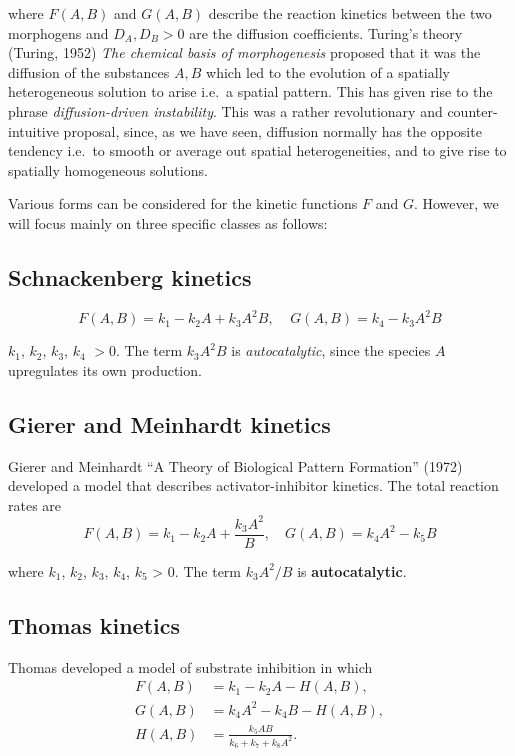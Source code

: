 \documentclass[
  letterpaper,
  DIV=11,
  numbers=noendperiod]{scrreprt}
\theoremstyle{plain}
\theoremstyle{definition}
\theoremstyle{plain}
\theoremstyle{remark}
\begin{document}
where \(F(A,B)\) and \(G(A,B)\) describe the reaction kinetics between
the two morphogens and \(D_A, D_B > 0\) are the diffusion coefficients.
Turing's theory (Turing, 1952) \emph{The chemical basis of
morphogenesis} proposed that it was the diffusion of the substances
\(A,B\) which led to the evolution of a spatially heterogeneous solution
to arise i.e.~a spatial pattern. This has given rise to the phrase
\emph{diffusion-driven instability}. This was a rather revolutionary and
counter-intuitive proposal, since, as we have seen, diffusion normally
has the opposite tendency i.e.~to smooth or average out spatial
heterogeneities, and to give rise to spatially homogeneous solutions.

Various forms can be considered for the kinetic functions \(F\) and
\(G\). However, we will focus mainly on three specific classes as
follows:

\hypertarget{schnackenberg-kinetics}{%
\subsection{Schnackenberg kinetics}\label{schnackenberg-kinetics}}

\[
F(A,B) = k_1 - k_2 A + k_3 A^2 B, \;\;\;\; G(A,B) = k_4 - k_3 A^2 B
\]

\(k_1\), \(k_2\), \(k_3\), \(k_4\) \(>0\). The term \(k_3 A^2 B\) is
\emph{autocatalytic}, since the species \(A\) upregulates its own
production.

\hypertarget{gierer-and-meinhardt-kinetics}{%
\subsection{Gierer and Meinhardt
kinetics}\label{gierer-and-meinhardt-kinetics}}

Gierer and Meinhardt {``A Theory of Biological Pattern Formation''}
(1972) developed a model that describes activator-inhibitor kinetics.
The total reaction rates are \[
F(A,B) = k_1 - k_2 A + \frac{k_3 A^2}{B}, \quad G(A,B) = k_4 A^2 - k_5 B
\]

where \(k_1\), \(k_2\), \(k_3\), \(k_4\), \(k_5\) \textgreater{} 0. The
term \(k_3 A^2 / B\) is \textbf{autocatalytic}.

\hypertarget{thomas-kinetics}{%
\subsection{Thomas kinetics}\label{thomas-kinetics}}

Thomas developed a model of substrate inhibition in which \[
\begin{aligned}
F(A,B) &= k_1 - k_2 A - H(A,B), \\
G(A,B) &= k_4 A^2 - k_4 B -H(A,B), \\ 
H(A,B) &= \frac{k_5 AB}{k_6 + k_7 + k_8 A^2}.
\end{aligned}
\]
\end{document}

